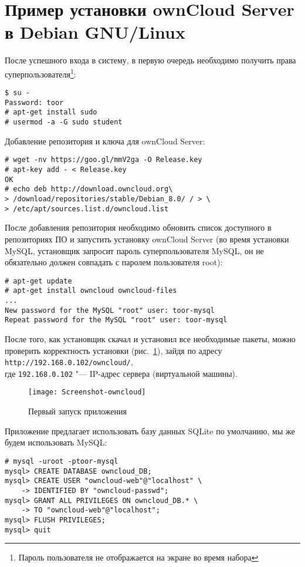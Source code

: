 \section{Пример установки ownCloud Server в Debian GNU/Linux} \label{pril:c}

После успешного входа в систему, в первую очередь необходимо получить права суперпользователя\footnote{Пароль пользователя не отображается на экране во время набора}:
\begin{lstlisting}
$ su -
Password: toor
# apt-get install sudo
# usermod -a -G sudo student
\end{lstlisting}

Добавление репозитория и ключа для ownCloud Server:
\begin{lstlisting}
# wget -nv https://goo.gl/mmV2ga -O Release.key
# apt-key add - < Release.key
OK
# echo deb http://download.owncloud.org\
> /download/repositories/stable/Debian_8.0/ / > \
> /etc/apt/sources.list.d/owncloud.list
\end{lstlisting}

После добавления репозитория необходимо обновить список доступного в репозиториях ПО и запустить установку ownCloud Server (во время установки MySQL, установщик запросит пароль суперпользователя MySQL, он не обязательно должен совпадать с паролем пользователя root):
\begin{lstlisting}
# apt-get update
# apt-get install owncloud owncloud-files
...
New password for the MySQL "root" user: toor-mysql
Repeat password for the MySQL "root" user: toor-mysql
\end{lstlisting}

После того, как установщик скачал и установил все необходимые пакеты, можно проверить корректность установки (рис.~\ref{pic:first-own}), зайдя по адресу \texttt{http://192.168.0.102/owncloud/}, \\
где \texttt{192.168.0.102} "--- IP-адрес сервера (виртуальной машины).

\begin{figure}[ht]
    \centering
	\texttt{[image: Screenshot-owncloud]}
	\caption{Первый запуск приложения}\label{pic:first-own}
\end{figure}

Приложение предлагает использовать базу данных SQLite по умолчанию, мы же будем использовать MySQL:
\begin{lstlisting}
# mysql -uroot -ptoor-mysql
mysql> CREATE DATABASE owncloud_DB;
mysql> CREATE USER "owncloud-web"@"localhost" \
    -> IDENTIFIED BY "owncloud-passwd";
mysql> GRANT ALL PRIVILEGES ON owncloud_DB.* \
    -> TO "owncloud-web"@"localhost";
mysql> FLUSH PRIVILEGES;
mysql> quit
\end{lstlisting}

